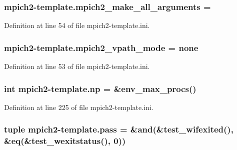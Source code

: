 \hypertarget{namespacempich2-template_a46562d5738a372655d9a055eb0feffe5}{
\subsubsection[{mpich2\-\_\-make\-\_\-all\-\_\-arguments}]{\setlength{\rightskip}{0pt plus 5cm}mpich2-\/template.\-mpich2\-\_\-make\-\_\-all\-\_\-arguments =}}\label{namespacempich2-template_a46562d5738a372655d9a055eb0feffe5}


Definition at line 54 of file mpich2-\/template.\-ini.

\hypertarget{namespacempich2-template_a0f5c02d35394fb0540d3ec8d2d291edf}{
\subsubsection[{mpich2\-\_\-vpath\-\_\-mode}]{\setlength{\rightskip}{0pt plus 5cm}mpich2-\/template.\-mpich2\-\_\-vpath\-\_\-mode = none}}\label{namespacempich2-template_a0f5c02d35394fb0540d3ec8d2d291edf}


Definition at line 53 of file mpich2-\/template.\-ini.

\hypertarget{namespacempich2-template_a1e4ef87053b35546931a526e5b33730f}{
\subsubsection[{np}]{\setlength{\rightskip}{0pt plus 5cm}int mpich2-\/template.\-np = \&env\-\_\-max\-\_\-procs()}}\label{namespacempich2-template_a1e4ef87053b35546931a526e5b33730f}


Definition at line 225 of file mpich2-\/template.\-ini.

\hypertarget{namespacempich2-template_ac6c94e8a4a76923d3a3720603dfaa59f}{
\subsubsection[{pass}]{\setlength{\rightskip}{0pt plus 5cm}tuple mpich2-\/template.\-pass = \&and(\&test\-\_\-wifexited(), \&eq(\&test\-\_\-wexitstatus(), 0))}}\label{namespacempich2-template_ac6c94e8a4a76923d3a3720603dfaa59f}


